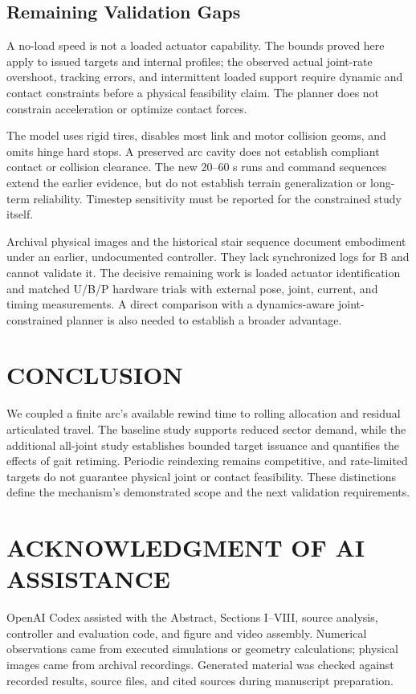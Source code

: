 \documentclass[letterpaper,10pt,conference]{ieeeconf}
\begin{document}
\subsection{Remaining Validation Gaps}
A no-load speed is not a loaded actuator capability. The bounds proved here apply to issued targets and internal profiles; the observed actual joint-rate overshoot, tracking errors, and intermittent loaded support require dynamic and contact constraints before a physical feasibility claim. The planner does not constrain acceleration or optimize contact forces.

The model uses rigid tires, disables most link and motor collision geoms, and omits hinge hard stops. A preserved arc cavity does not establish compliant contact or collision clearance. The new 20--60 s runs and command sequences extend the earlier evidence, but do not establish terrain generalization or long-term reliability. Timestep sensitivity must be reported for the constrained study itself.

Archival physical images and the historical stair sequence document embodiment under an earlier, undocumented controller. They lack synchronized logs for B and cannot validate it. The decisive remaining work is loaded actuator identification and matched U/B/P hardware trials with external pose, joint, current, and timing measurements. A direct comparison with a dynamics-aware joint-constrained planner is also needed to establish a broader advantage.

\section{CONCLUSION}
We coupled a finite arc's available rewind time to rolling allocation and residual articulated travel. The baseline study supports reduced sector demand, while the additional all-joint study establishes bounded target issuance and quantifies the effects of gait retiming. Periodic reindexing remains competitive, and rate-limited targets do not guarantee physical joint or contact feasibility. These distinctions define the mechanism's demonstrated scope and the next validation requirements.

\noindent\begin{minipage}{\columnwidth}
\section*{ACKNOWLEDGMENT OF AI ASSISTANCE}
OpenAI Codex assisted with the Abstract, Sections I--VIII, source analysis, controller and evaluation code, and figure and video assembly. Numerical observations came from executed simulations or geometry calculations; physical images came from archival recordings. Generated material was checked against recorded results, source files, and cited sources during manuscript preparation.
\end{minipage}
\par{}
\end{document}
